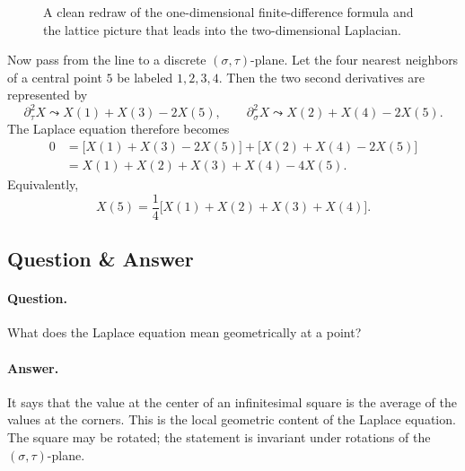 \begin{figure}
\centering
{}
\caption{A clean redraw of the one-dimensional finite-difference formula and the lattice picture that leads into the two-dimensional Laplacian.}
\end{figure}

Now pass from the line to a discrete \((\sigma,\tau)\)-plane. Let the four nearest neighbors of a central point \(5\) be labeled \(1,2,3,4\). Then the two second derivatives are represented by
\begin{equation}
\partial_\tau^2 X \leadsto X(1)+X(3)-2X(5),
\qquad
\partial_\sigma^2 X \leadsto X(2)+X(4)-2X(5).
\end{equation}
The Laplace equation therefore becomes
\begin{align}
0
&=
\bigl[X(1)+X(3)-2X(5)\bigr]
+
\bigl[X(2)+X(4)-2X(5)\bigr] \\
&=
X(1)+X(2)+X(3)+X(4)-4X(5).
\end{align}
Equivalently,
\begin{equation}
X(5)=\frac14\bigl[X(1)+X(2)+X(3)+X(4)\bigr].
\end{equation}

\subsection{Question \& Answer}

\paragraph{Question.} What does the Laplace equation mean geometrically at a point?

\paragraph{Answer.} It says that the value at the center of an infinitesimal square is the average of the values at the corners. This is the local geometric content of the Laplace equation. The square may be rotated; the statement is invariant under rotations of the \((\sigma,\tau)\)-plane.


